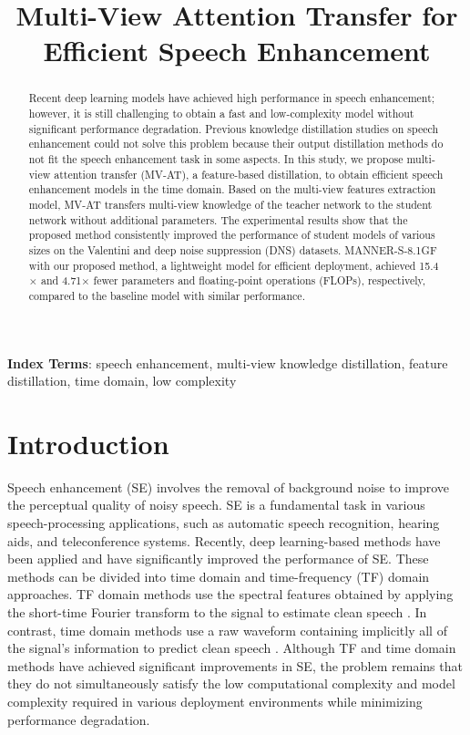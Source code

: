 \documentclass[a4paper]{article}
\title{Multi-View Attention Transfer for Efficient Speech Enhancement}
\begin{document}
\maketitle
\begin{abstract}
Recent deep learning models have achieved high performance in speech enhancement; however, it is still challenging to obtain a fast and low-complexity model without significant performance degradation. Previous knowledge distillation studies on speech enhancement could not solve this problem because their output distillation methods do not fit the speech enhancement task in some aspects. In this study, we propose multi-view attention transfer (MV-AT), a feature-based distillation, to obtain efficient speech enhancement models in the time domain. Based on the multi-view features extraction model, MV-AT transfers multi-view knowledge of the teacher network to the student network without additional parameters. The experimental results show that the proposed method consistently improved the performance of student models of various sizes on the Valentini and deep noise suppression (DNS) datasets. MANNER-S-8.1GF with our proposed method, a lightweight model for efficient deployment, achieved 15.4$\times$ and 4.71$\times$ fewer parameters and floating-point operations (FLOPs), respectively, compared to the baseline model with similar performance.
\end{abstract}
\noindent\textbf{Index Terms}: speech enhancement, multi-view knowledge distillation, feature distillation, time domain, low complexity
\section{Introduction}

Speech enhancement (SE) involves the removal of background noise to improve the perceptual quality of noisy speech. SE is a fundamental task in various speech-processing applications, such as automatic speech recognition, hearing aids, and teleconference systems. Recently, deep learning-based methods have been applied and have significantly improved the performance of SE. These methods can be divided into time domain and time-frequency (TF) domain approaches. TF domain methods use the spectral features obtained by applying the short-time Fourier transform to the signal to estimate clean speech \cite{tan2018convolutional,yin2020phasen,zheng2020interactive,fu2019metricgan,fu2021metricgan+}. In contrast, time domain methods use a raw waveform containing implicitly all of the signal's information to predict clean speech \cite{park2022manner,defossez2020real,wang2021tstnn,pandey2020dual}. 
Although TF and time domain methods have achieved significant improvements in SE, the problem remains that they do not simultaneously satisfy the low computational complexity and model complexity required in various deployment environments while minimizing performance degradation.
\end{document}
